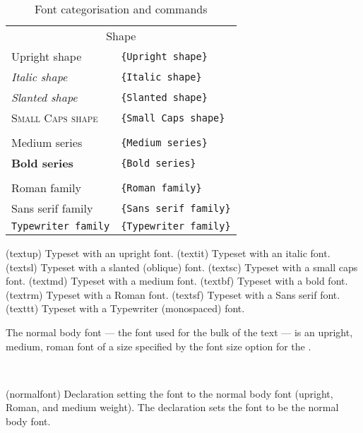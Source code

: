 \begin{table}
\centering
\caption{Font categorisation and commands} \label{tab:fontcat}
\begin{tabular}{ll} \toprule
\multicolumn{2}{c}{Shape}\index{font characteristic!shape} \\ \addlinespace
\textup{Upright shape}     & \cmd{\textup}\verb?{Upright shape}? \\
\textit{Italic shape}      & \cmd{\textit}\verb?{Italic shape}? \\
\textsl{Slanted shape}     & \cmd{\textsl}\verb?{Slanted shape}? \\
\textsc{Small Caps shape}  & \cmd{\textsc}\verb?{Small Caps shape}? \\ \addlinespace
\multicolumn{2}{c}{Series or weight}\index{font characteristic!series} \\ \addlinespace
\textmd{Medium series}     & \cmd{\textmd}\verb?{Medium series}? \\
\textbf{Bold series}       & \cmd{\textbf}\verb?{Bold series}? \\ \addlinespace
\multicolumn{2}{c}{Family}\index{font characteristic!family} \\ \addlinespace
\textrm{Roman family}      & \cmd{\textrm}\verb?{Roman family}? \\ 
\textsf{Sans serif family} & \cmd{\textsf}\verb?{Sans serif family}? \\ 
\texttt{Typewriter family} & \cmd{\texttt}\verb?{Typewriter family}? \\ 
\bottomrule
\end{tabular}
\glossary(textup)%
  {}%
  {Typeset  with an upright font.}
\glossary(textit)%
  {}%
  {Typeset  with an italic font.}
\glossary(textsl)%
  {}%
  {Typeset  with a slanted (oblique) font.}
\glossary(textsc)%
  {}%
  {Typeset  with a small caps font.}
\glossary(textmd)%
  {}%
  {Typeset  with a medium font.}
\glossary(textbf)%
  {}%
  {Typeset  with a bold font.}
\glossary(textrm)%
  {}%
  {Typeset  with a Roman font.}
\glossary(textsf)%
  {}%
  {Typeset  with a Sans serif font.}
\glossary(texttt)%
  {}%
  {Typeset  with a Typewriter (monospaced) font.}
\end{table}

    The normal body font --- the font used for the bulk 
of the text ---
is an upright, medium, roman font of a size specified by the font size
option for the \cmd{\documentclass}.
\begin{syntax}
\cmd{\normalfont} \\
\end{syntax}
\glossary(normalfont)%
  {}%
  {Declaration setting the font to the normal body font (upright, Roman,
and medium weight).} 
The declaration \cmd{\normalfont} sets the font to be the normal body font.

